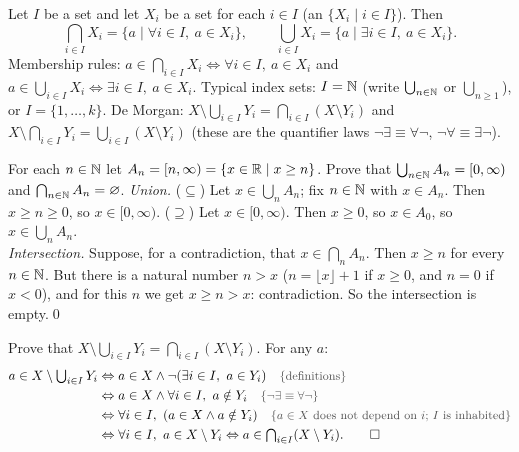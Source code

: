 \begin{key}
Let $I$ be a set and let $X_i$ be a set for each $i\in I$ (an  $\{X_i\mid i\in I\}$). Then
\[
\bigcap_{i\in I}X_i=\{a\mid\forall i\in I,\ a\in X_i\},\qquad
\bigcup_{i\in I}X_i=\{a\mid\exists i\in I,\ a\in X_i\}.
\]
Membership rules: $a\in\bigcap_{i\in I}X_i\Leftrightarrow\forall i\in I,\ a\in X_i$ and $a\in\bigcup_{i\in I}X_i\Leftrightarrow\exists i\in I,\ a\in X_i$. Typical index sets: $I=\mathbb{N}$ (write $\bigcup_{n\in\mathbb{N}}$ or $\bigcup_{n\ge1}$), or $I=\{1,\dots,k\}$. De Morgan: $X\setminus\bigcup_{i\in I}Y_i=\bigcap_{i\in I}(X\setminus Y_i)$ and $X\setminus\bigcap_{i\in I}Y_i=\bigcup_{i\in I}(X\setminus Y_i)$ (these are the quantifier laws $\neg\exists\equiv\forall\neg$, $\neg\forall\equiv\exists\neg$).
\end{key}

\begin{hexample}
For each $n\in\mathbb{N}$ let $A_n=[n,\infty)=\{x\in\mathbb{R}\mid x\ge n\}$. Prove that $\bigcup_{n\in\mathbb{N}}A_n=[0,\infty)$ and $\bigcap_{n\in\mathbb{N}}A_n=\varnothing$.
\solution
\emph{Union.} ($\subseteq$) Let $x\in\bigcup_nA_n$; fix $n\in\mathbb{N}$ with $x\in A_n$. Then $x\ge n\ge0$, so $x\in[0,\infty)$. ($\supseteq$) Let $x\in[0,\infty)$. Then $x\ge0$, so $x\in A_0$, so $x\in\bigcup_nA_n$.\\
\emph{Intersection.} Suppose, for a contradiction, that $x\in\bigcap_nA_n$. Then $x\ge n$ for every $n\in\mathbb{N}$. But there is a natural number $n>x$ (\eg $n=\lfloor x\rfloor+1$ if $x\ge0$, and $n=0$ if $x<0$), and for this $n$ we get $x\ge n>x$: contradiction. So the intersection is empty.\qed
\end{hexample}

\begin{hexample}
Prove that $X\setminus\bigcup_{i\in I}Y_i=\bigcap_{i\in I}(X\setminus Y_i)$.
\solution
For any $a$:
\begin{align*}
a\in X\setminus\textstyle\bigcup_{i\in I}Y_i
&\Leftrightarrow a\in X\wedge\neg(\exists i\in I,\ a\in Y_i)\reason{definitions}\\
&\Leftrightarrow a\in X\wedge\forall i\in I,\ a\notin Y_i\reason{$\neg\exists\equiv\forall\neg$}\\
&\Leftrightarrow\forall i\in I,\ (a\in X\wedge a\notin Y_i)\reason{$a\in X$ does not depend on $i$; $I$ is inhabited}\\
&\Leftrightarrow\forall i\in I,\ a\in X\setminus Y_i\Leftrightarrow a\in\textstyle\bigcap_{i\in I}(X\setminus Y_i).\qquad\square
\end{align*}
\end{hexample}

